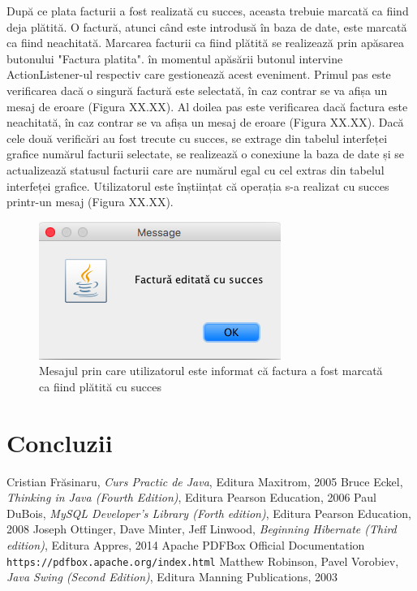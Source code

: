 \documentclass[12pt]{book}
\begin{document}
După ce plata facturii a fost realizată cu succes, aceasta trebuie marcată ca fiind deja plătită. O factură, atunci când este introdusă în baza de date, este marcată ca fiind neachitată. Marcarea facturii ca fiind plătită se realizează prin apăsarea butonului "Factura platita". în momentul apăsării butonul intervine ActionListener-ul respectiv care gestionează acest eveniment. Primul pas este verificarea dacă o singură factură este selectată, în caz contrar se va afișa un mesaj de eroare (Figura XX.XX). Al doilea pas este verificarea dacă factura este neachitată, în caz contrar se va afișa un mesaj de eroare (Figura XX.XX). Dacă cele două verificări au fost trecute cu succes, se extrage din tabelul interfeței grafice numărul facturii selectate, se realizează o conexiune la baza de date și se actualizează statusul facturii care are numărul egal cu cel extras din tabelul interfeței grafice. Utilizatorul este înștiințat că operația s-a realizat cu succes printr-un mesaj (Figura XX.XX).

\begin{figure}[!ht]
	\centering
	\includegraphics{EditareSucces}
	\caption{Mesajul prin care utilizatorul este informat că factura a fost marcată ca fiind plătită cu succes}
\end{figure}


\chapter{Concluzii}

\begin{thebibliography}{9}
	  Cristian Frăsinaru, {\em Curs Practic de Java}, Editura Maxitrom, 2005
	  Bruce Eckel, {\em Thinking in Java (Fourth Edition)}, Editura Pearson Education, 2006
	 Paul DuBois, {\em MySQL Developer's Library (Forth edition)}, Editura Pearson Education, 2008
	 Joseph Ottinger, Dave Minter, Jeff Linwood, {\em Beginning Hibernate (Third edition)}, Editura Appres, 2014
	 Apache PDFBox Official Documentation
	\\\texttt{https://pdfbox.apache.org/index.html}
	 Matthew Robinson, Pavel Vorobiev, {\em Java Swing (Second Edition)}, Editura Manning Publications, 2003
\end{thebibliography}
	
\end{document}
